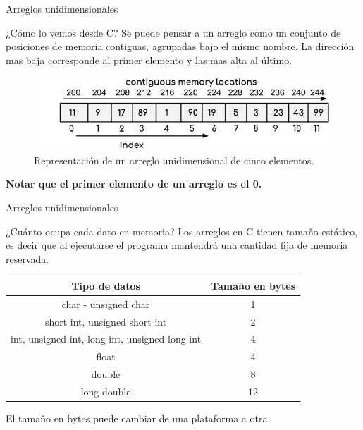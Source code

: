 \documentclass[xcolor=pdftex,table,11pt]{beamer}
\begin{document}
\begin{frame}{Arreglos unidimensionales}
\begin{block}{¿Cómo lo vemos desde C?}
Se puede pensar a un arreglo como un conjunto de posiciones de memoria contiguas, agrupadas bajo el mismo nombre. La dirección mas baja corresponde al primer elemento y las mas alta al último.
\end{block}

\begin{figure}
 \centering
\includegraphics[scale=0.5]{../img/exported/array_with_memory.jpg}
\caption{Representación de un arreglo unidimensional de cinco elementos.}
\end{figure}

\textbf{Notar que el primer elemento de un arreglo es el 0.}

\end{frame}

\begin{frame}{Arreglos unidimensionales}
\begin{block}{¿Cuánto ocupa cada dato en memoria?}
Los arreglos en C tienen tamaño estático, es decir que al ejecutarse el programa mantendrá una cantidad fija de memoria reservada.

\end{block}
\vspace{0.5cm}

\begin{tabular}{|c|c|}
\hline 
\textbf{Tipo de datos} & \textbf{Tamaño en bytes} \\ 
\hline 
char - unsigned char & 1\\ 
\hline 
short int, unsigned short int & 2 \\ 
\hline 
int, unsigned int, long int, unsigned long int & 4 \\ 
\hline 
float & 4 \\ 
\hline 
double & 8 \\ 
\hline
long double & 12\\ 
\hline 
\end{tabular} 
\vspace{0.5cm}
El tamaño en bytes puede cambiar de una plataforma a otra.

\end{frame}
\end{document}
